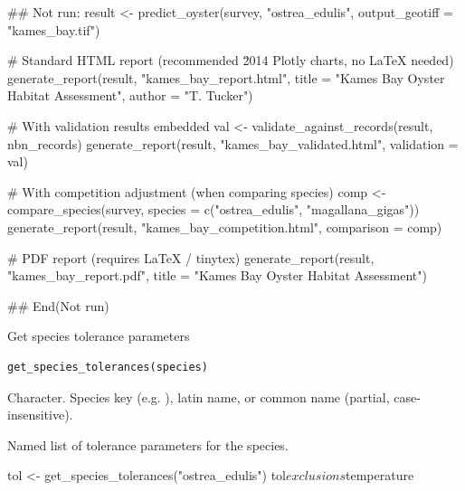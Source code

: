 \documentclass[a4paper]{book}
\begin{document}
%
\begin{Examples}
\begin{ExampleCode}
## Not run: 
result <- predict_oyster(survey, "ostrea_edulis",
                         output_geotiff = "kames_bay.tif")

# Standard HTML report (recommended \u2014 Plotly charts, no LaTeX needed)
generate_report(result, "kames_bay_report.html",
                title  = "Kames Bay Oyster Habitat Assessment",
                author = "T. Tucker")

# With validation results embedded
val  <- validate_against_records(result, nbn_records)
generate_report(result, "kames_bay_validated.html",
                validation = val)

# With competition adjustment (when comparing species)
comp <- compare_species(survey,
          species = c("ostrea_edulis", "magallana_gigas"))
generate_report(result, "kames_bay_competition.html",
                comparison = comp)

# PDF report (requires LaTeX / tinytex)
generate_report(result, "kames_bay_report.pdf",
                title = "Kames Bay Oyster Habitat Assessment")

## End(Not run)
\end{ExampleCode}
\end{Examples}
%
\begin{Description}
Get species tolerance parameters
\end{Description}
%
\begin{Usage}
\begin{verbatim}
get_species_tolerances(species)
\end{verbatim}
\end{Usage}
%
\begin{Arguments}
\begin{ldescription}
\item[\code{species}] Character. Species key (e.g. ), latin name,
or common name (partial, case-insensitive).
\end{ldescription}
\end{Arguments}
%
\begin{Value}
Named list of tolerance parameters for the species.
\end{Value}
%
\begin{Examples}
\begin{ExampleCode}
tol <- get_species_tolerances("ostrea_edulis")
tol$exclusions$temperature
\end{ExampleCode}
\end{Examples}
\end{document}
